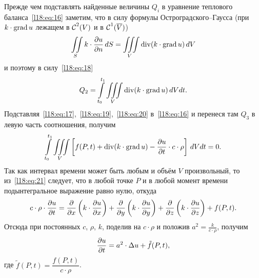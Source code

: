 Прежде чем подставлять найденные величины $Q_i$ в уравнение теплового баланса~\eqref{l18:eq:16} заметим, что в силу формулы Остроградского--Гаусса (при $k\cdot\grad u$ лежащем в $\Cfn[]{2}(V)$ и в $\Cfn[]{1}(\overline{V})$)
\begin{equation*}
	\hfill \iint\limits_{S}k\cdot\pder{u}{n}\,dS=\iiint\limits_{V}\Div(k\cdot\grad u)\,dV\hfill
\end{equation*}
и поэтому в силу~\eqref{l18:eq:18}
\begin{equation}\label{l18:eq:20}
	\hfill Q_2=\int\limits_{t_0}^{t_1}\iiint\limits_{V}\Div(k\cdot\grad u)\,dVdt.\hfill
\end{equation}
Подставляя~\eqref{l18:eq:17},~\eqref{l18:eq:19},~\eqref{l18:eq:20} в~\eqref{l18:eq:16} и перенеся там $Q_3$ в левую часть соотношения, получим
\begin{equation}\label{l18:eq:21}
	\hfill \int\limits_{t_0}^{t_1}\iiint\limits_{V}\left[f(P,t)+\Div(k\cdot\grad u)-\pder{u}{t}\cdot c\cdot\rho\right]\,dVdt=0.\hfill
\end{equation}
Так как интервал времени может быть любым и объём $V$ произвольный, то из~\eqref{l18:eq:21} следует, что в любой точке $P$ и в любой момент времени подынтегральное выражение равно нулю, откуда 
\begin{equation}\label{l18:eq:22}
	\hfill c\cdot\rho\cdot\pder{u}{t}=\pder{}{x}\left(k\cdot\pder{u}{x}\right)+\pder{}{y}\left(k\cdot\pder{u}{y}\right)+\pder{}{z}\left(k\cdot\pder{u}{z}\right)+f(P,t). \hfill
\end{equation}
Отсюда при постоянных $c$, $\rho$, $k$, поделив на $c\cdot\rho$ и положив $a^2=\frac{k}{c\cdot\rho}$, получим
\begin{equation}\label{l18:eq:23}
	\hfill\pder{u}{t}=a^2\cdot\Delta u+\tilde{f}(P,t),\hfill
\end{equation}
где $\tilde{f}(P,t)=\dfrac{f(P,t)}{c\cdot\rho}$.

